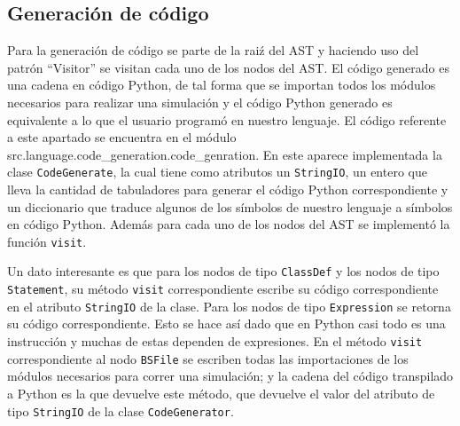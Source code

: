 \subsection{Generaci\'on de c\'odigo}

Para la generaci\'on de c\'odigo se parte de la rai\'z del AST y haciendo uso del patr\'on ``Visitor'' se visitan cada uno de los nodos del AST. El c\'odigo generado es una cadena en c\'odigo Python, de tal forma que se importan todos los m\'odulos necesarios para realizar una simulaci\'on y el c\'odigo Python generado es equivalente a lo que el usuario program\'o en nuestro lenguaje. El c\'odigo referente a este apartado se encuentra en el m\'odulo src.language.code\_generation.code\_genration. En este aparece implementada la clase \verb|CodeGenerate|, la cual tiene como atributos un \verb|StringIO|, un entero que lleva la cantidad de tabuladores para generar el c\'odigo Python correspondiente y un diccionario que traduce algunos de los s\'imbolos de nuestro lenguaje a s\'imbolos en c\'odigo Python. Adem\'as para cada uno de los nodos del AST se implement\'o la funci\'on \verb|visit|. 

Un dato interesante es que para los nodos de tipo \verb|ClassDef| y los nodos de tipo \verb|Statement|, su m\'etodo \verb|visit| correspondiente escribe su c\'odigo correspondiente en el atributo \verb|StringIO| de la clase. Para los nodos de tipo \verb|Expression| se retorna su c\'odigo correspondiente. Esto se hace as\'i dado que en Python casi todo es una instrucci\'on y muchas de estas dependen de expresiones. En el m\'etodo \verb|visit| correspondiente al nodo \verb|BSFile| se escriben todas las importaciones de los m\'odulos necesarios para correr una simulaci\'on; y la cadena del c\'odigo transpilado a Python es la que devuelve este m\'etodo, que devuelve el valor del atributo de tipo \verb|StringIO| de la clase \verb|CodeGenerator|. 

